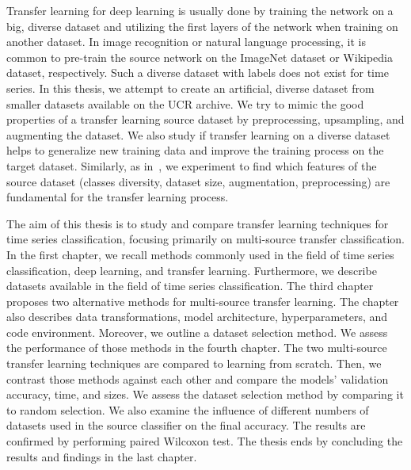 \documentclass[a4paper,11pt,twoside]{report}
\theoremstyle{definition}
\begin{document}
Transfer learning for deep learning is usually done by training the network on a big, diverse dataset and utilizing the first layers of the network when training on another dataset. In image recognition or natural language processing, it is common to pre-train the source network on the ImageNet dataset or Wikipedia dataset, respectively. Such a diverse dataset with labels does not exist for time series. In this thesis, we attempt to create an artificial, diverse dataset from smaller datasets available on the UCR archive. We try to mimic the good properties of a transfer learning source dataset by preprocessing, upsampling, and augmenting the dataset. We also study if transfer learning on a diverse dataset helps to generalize new training data and improve the training process on the target dataset. Similarly, as in~\cite{imagnet}, we experiment to find which features of the source dataset (classes diversity, dataset size, augmentation, preprocessing) are fundamental for the transfer learning process.

The aim of this thesis is to study and compare transfer learning techniques for time series classification, focusing primarily on multi-source transfer classification. In the first chapter, we recall methods commonly used in the field of time series classification, deep learning, and transfer learning. Furthermore, we describe datasets available in the field of time series classification. The third chapter proposes two alternative methods for multi-source transfer learning. The chapter also describes data transformations, model architecture, hyperparameters, and code environment. Moreover, we outline a dataset selection method. We assess the performance of those methods in the fourth chapter. The two multi-source transfer learning techniques are compared to learning from scratch. Then, we contrast those methods against each other and compare the models' validation accuracy, time, and sizes. We assess the dataset selection method by comparing it to random selection. We also examine the influence of different numbers of datasets used in the source classifier on the final accuracy. The results are confirmed by performing paired Wilcoxon test. The thesis ends by concluding the results and findings in the last chapter.
%
\end{document}
